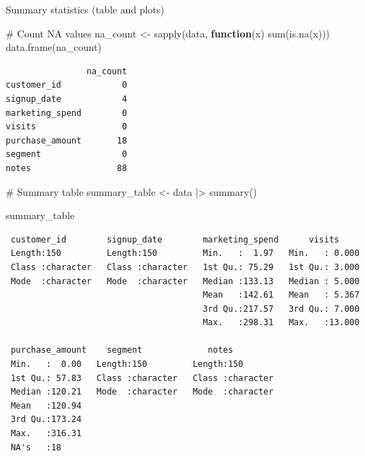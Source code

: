 \documentclass[
  letterpaper,
  DIV=11,
  numbers=noendperiod]{scrartcl}
\newenvironment{Shaded}{\begin{snugshade}}{\end{snugshade}}
\newcommand{\CommentTok}[1]{\textcolor[rgb]{0.37,0.37,0.37}{#1}}
\newcommand{\ControlFlowTok}[1]{\textcolor[rgb]{0.00,0.23,0.31}{\textbf{#1}}}
\newcommand{\FunctionTok}[1]{\textcolor[rgb]{0.28,0.35,0.67}{#1}}
\newcommand{\NormalTok}[1]{\textcolor[rgb]{0.00,0.23,0.31}{#1}}
\newcommand{\OtherTok}[1]{\textcolor[rgb]{0.00,0.23,0.31}{#1}}
\newcommand{\SpecialCharTok}[1]{\textcolor[rgb]{0.37,0.37,0.37}{#1}}
\begin{document}
Summary statistics (table and plots)

\begin{Shaded}
\begin{Highlighting}[]
\CommentTok{\# Count NA values}
\NormalTok{na\_count }\OtherTok{\textless{}{-}} \FunctionTok{sapply}\NormalTok{(data, }\ControlFlowTok{function}\NormalTok{(x) }\FunctionTok{sum}\NormalTok{(}\FunctionTok{is.na}\NormalTok{(x)))}
\FunctionTok{data.frame}\NormalTok{(na\_count)}
\end{Highlighting}
\end{Shaded}

\begin{verbatim}
                na_count
customer_id            0
signup_date            4
marketing_spend        0
visits                 0
purchase_amount       18
segment                0
notes                 88
\end{verbatim}

\begin{Shaded}
\begin{Highlighting}[]
\CommentTok{\# Summary table}
\NormalTok{summary\_table }\OtherTok{\textless{}{-}}\NormalTok{ data }\SpecialCharTok{|\textgreater{}} \FunctionTok{summary}\NormalTok{()}

\NormalTok{summary\_table}
\end{Highlighting}
\end{Shaded}

\begin{verbatim}
 customer_id        signup_date        marketing_spend      visits      
 Length:150         Length:150         Min.   :  1.97   Min.   : 0.000  
 Class :character   Class :character   1st Qu.: 75.29   1st Qu.: 3.000  
 Mode  :character   Mode  :character   Median :133.13   Median : 5.000  
                                       Mean   :142.61   Mean   : 5.367  
                                       3rd Qu.:217.57   3rd Qu.: 7.000  
                                       Max.   :298.31   Max.   :13.000  
                                                                        
 purchase_amount    segment             notes          
 Min.   :  0.00   Length:150         Length:150        
 1st Qu.: 57.83   Class :character   Class :character  
 Median :120.21   Mode  :character   Mode  :character  
 Mean   :120.94                                        
 3rd Qu.:173.24                                        
 Max.   :316.31                                        
 NA's   :18                                            
\end{verbatim}
\end{document}
